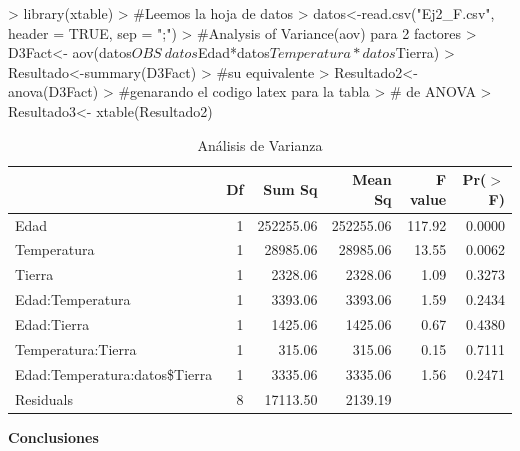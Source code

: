 \documentclass[12pt,letterpaper]{report}
\begin{document}
\begin{Schunk}
\begin{Sinput}
> library(xtable)
> #Leemos la hoja de datos
> datos<-read.csv("Ej2_F.csv", header = TRUE, sep = ";")
> #Analysis of Variance(aov) para 2 factores
> D3Fact<- aov(datos$OBS~ datos$Edad*datos$Temperatura*datos$Tierra)
> Resultado<-summary(D3Fact)
> #su equivalente
> Resultado2<- anova(D3Fact)
> #genarando el codigo latex para la tabla
> # de ANOVA
> Resultado3<- xtable(Resultado2) 
\end{Sinput}
\end{Schunk}

\begin{table}[ht]
\centering
\begin{tabular}{lrrrrr}
  \hline
 & Df & Sum Sq & Mean Sq & F value & Pr($>$F) \\ 
  \hline
Edad & 1 & 252255.06 & 252255.06 & 117.92 & 0.0000 \\ 
Temperatura & 1 & 28985.06 & 28985.06 & 13.55 & 0.0062 \\ 
Tierra & 1 & 2328.06 & 2328.06 & 1.09 & 0.3273 \\ 
Edad:Temperatura & 1 & 3393.06 & 3393.06 & 1.59 & 0.2434 \\ 
Edad:Tierra & 1 & 1425.06 & 1425.06 & 0.67 & 0.4380 \\ 
Temperatura:Tierra & 1 & 315.06 & 315.06 & 0.15 & 0.7111 \\ 
Edad:Temperatura:datos\$Tierra & 1 & 3335.06 & 3335.06 & 1.56 & 0.2471 \\ 
Residuals & 8 & 17113.50 & 2139.19 &  &  \\ 
   \hline
\end{tabular}
\caption{Análisis de Varianza}
\end{table}

\newpage
\textbf{Conclusiones}
\end{document}
